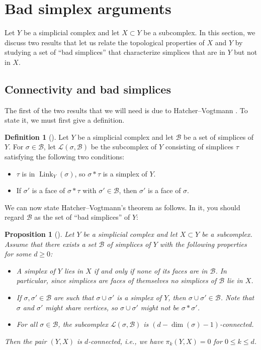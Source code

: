 \documentclass[11pt]{amsart}
\numberwithin{equation}{section}
\theoremstyle{plain}
\newtheorem{proposition}[theorem]{Proposition}
\theoremstyle{definition}
\newtheorem{defn}[theorem]{Definition}
\newenvironment{definition}[1][]{\begin{defn}[#1]\pushQED{\qed}}{\popQED \end{defn}}
\theoremstyle{remark}
\newcommand\cB{\ensuremath{\mathcal{B}}}
\newcommand\cL{\ensuremath{\mathcal{L}}}
\DeclareMathOperator{\Link}{Link}
\begin{document}
\section{Bad simplex arguments}
\label{section:badsimplex}

Let $Y$ be a simplicial complex and let $X \subset Y$ be a subcomplex.  In this section, we discuss
two results that let us relate the topological properties of $X$ and $Y$ by studying a set
of ``bad simplices'' that characterize simplices that are in $Y$ but not in $X$.

\subsection{Connectivity and bad simplices}
The first of the two results that we will need is due to Hatcher--Vogtmann \cite{HatcherVogtmannTethers}.  To
state it, we must first give a definition.

\begin{definition}
\label{definition:badlink}
Let $Y$ be a simplicial complex and let $\cB$ be a set of simplices of $Y$.  For $\sigma \in \cB$,
let $\cL(\sigma,\cB)$ be the subcomplex of $Y$ consisting of simplices $\tau$ satisfying the following
two conditions:
\begin{itemize}
\item $\tau$ is in $\Link_Y(\sigma)$, so $\sigma \ast \tau$ is a simplex of $Y$.
\item If $\sigma'$ is a face of $\sigma \ast \tau$ with $\sigma' \in \cB$, then $\sigma'$
is a face of $\sigma$.\qedhere
\end{itemize}
\end{definition}

We can now state Hatcher--Vogtmann's theorem as follows.  In it, you should regard $\cB$ as
the set of ``bad simplices'' of $Y$:

\begin{proposition}[{\cite[Proposition 2.1]{HatcherVogtmannTethers}}]
\label{proposition:avoidbadeasy}
Let $Y$ be a simplicial complex and let $X \subset Y$ be a subcomplex.  Assume that there
exists a set $\cB$ of simplices of $Y$ with the following properties for some $d \geq 0$:
\begin{itemize}
\item[(i)] A simplex of $Y$ lies in $X$ if and only if none of its faces are in $\cB$.  In particular,
since simplices are faces of themselves no simplices of $\cB$ lie in $X$. 
\item[(ii)] If $\sigma,\sigma' \in \cB$ are such that $\sigma \cup \sigma'$ is a simplex
of $Y$, then $\sigma \cup \sigma' \in \cB$.  Note that $\sigma$ and $\sigma'$ might share vertices,
so $\sigma \cup \sigma'$ might not be $\sigma \ast \sigma'$.
\item[(iii)] For all $\sigma \in \cB$, the subcomplex $\cL(\sigma,\cB)$ is $(d-\dim(\sigma)-1)$-connected.
\end{itemize}
Then the pair $(Y,X)$ is $d$-connected, i.e., we have $\pi_k(Y,X)=0$ for $0 \leq k \leq d$.
\end{proposition}
\end{document}
